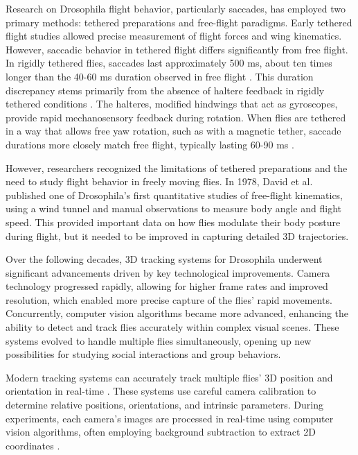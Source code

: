 \documentclass[../main/thesis_msc.tex]{subfiles}
\begin{document}
	Research on Drosophila flight behavior, particularly saccades, has employed two primary methods: tethered preparations and free-flight paradigms. Early tethered flight studies \autocite{gotz_flight_1968, vogel_i_1966} allowed precise measurement of flight forces and wing kinematics. However, saccadic behavior in tethered flight differs significantly from free flight. In rigidly tethered flies, saccades last approximately 500 ms, about ten times longer than the 40-60 ms duration observed in free flight \autocite{bender_comparison_2006, frye_odor_2003}. This duration discrepancy stems primarily from the absence of haltere feedback in rigidly tethered conditions \autocite{bender_visual_2006, frye_motor_2004}. The halteres, modified hindwings that act as gyroscopes, provide rapid mechanosensory feedback during rotation. When flies are tethered in a way that allows free yaw rotation, such as with a magnetic tether, saccade durations more closely match free flight, typically lasting 60-90 ms \autocite{bender_comparison_2006}.

	However, researchers recognized the limitations of tethered preparations and the need to study flight behavior in freely moving flies. In 1978, David et al. published one of Drosophila's first quantitative studies of free-flight kinematics, using a wind tunnel and manual observations to measure body angle and flight speed. This provided important data on how flies modulate their body posture during flight, but it needed to be improved in capturing detailed 3D trajectories.

	Over the following decades, 3D tracking systems for Drosophila underwent significant advancements driven by key technological improvements. Camera technology progressed rapidly, allowing for higher frame rates and improved resolution, which enabled more precise capture of the flies' rapid movements. Concurrently, computer vision algorithms became more advanced, enhancing the ability to detect and track flies accurately within complex visual scenes. These systems evolved to handle multiple flies simultaneously, opening up new possibilities for studying social interactions and group behaviors.

	Modern tracking systems can accurately track multiple flies' 3D position and orientation in real-time \autocite{straw_multi-camera_2011}. These systems use careful camera calibration to determine relative positions, orientations, and intrinsic parameters. During experiments, each camera's images are processed in real-time using computer vision algorithms, often employing background subtraction to extract 2D coordinates \autocite{fry_aerodynamics_2005}.
\end{document}
